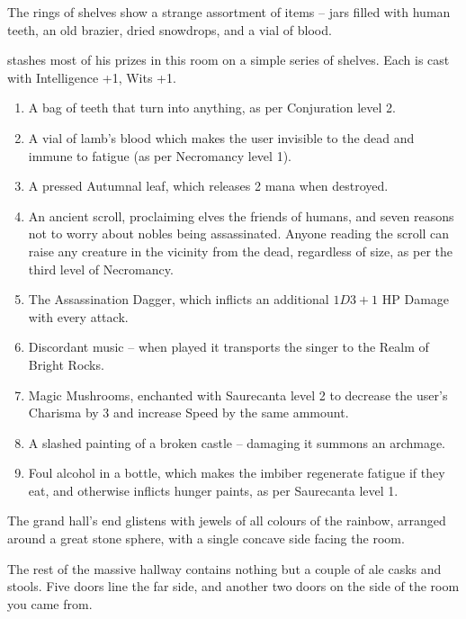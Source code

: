 \begin{boxtext}
	The rings of shelves show a strange assortment of items -- jars filled with human teeth, an old brazier, dried snowdrops, and a vial of blood.
\end{boxtext}

 stashes most of his prizes in this room on a simple series of shelves.  Each is cast with Intelligence +1, Wits +1.

\begin{enumerate}

	\item{A bag of teeth that turn into anything, as per Conjuration level 2.}
	\item{A vial of lamb's blood which makes the user invisible to the dead and immune to fatigue (as per Necromancy level 1).}
	\item{A pressed Autumnal leaf, which releases 2 mana when destroyed.}
	\item{An ancient scroll, proclaiming elves the friends of humans, and seven reasons not to worry about nobles being assassinated.  Anyone reading the scroll can raise any creature in the vicinity from the dead, regardless of size, as per the third level of Necromancy.}
	\item{The Assassination Dagger, which inflicts an additional $1D3+1$ HP Damage with every attack.}
	\item{Discordant music -- when played it transports the singer to the Realm of Bright Rocks.}
	\item{Magic Mushrooms, enchanted with Saurecanta level 2 to decrease the user's Charisma by 3 and increase Speed by the same ammount.}
	\item{A slashed painting of a broken castle -- damaging it summons an archmage.}
	\item{Foul alcohol in a bottle, which makes the imbiber regenerate fatigue if they eat, and otherwise inflicts hunger paints, as per Saurecanta level 1.}
\end{enumerate}



\begin{boxtext}
	The grand hall's end glistens with jewels of all colours of the rainbow, arranged around a great stone sphere, with a single concave side facing the room.

	The rest of the massive hallway contains nothing but a couple of ale casks and stools.  Five doors line the far side, and another two doors on the side of the room you came from.

\end{boxtext}

